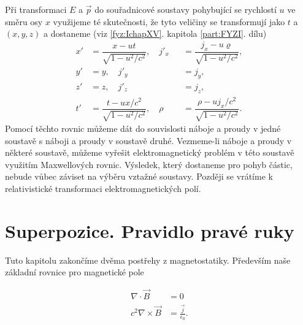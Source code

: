     Při transformaci \(E\) a \(\vec{p}\) do souřadnicové soustavy pohybující se rychlostí \(u\) ve
    směru osy \(x\) využijeme té skutečnosti, že tyto veličiny se transformují jako \(t\) a \((x, y,
    z)\) a dostaneme (viz \ref{fyz:IchapXV}. kapitola \ref{part:FYZI}. dílu)
    \begin{subequations}\label{fyz:eq824}
      \begin{alignat}{2}
        x'&=\dfrac{x -ut}{\sqrt{1−u^2/c^2}},\hspace{1em} 
        j'_x&&=\dfrac{j_x-u\varrho}{\sqrt{1−u^2/c^2}},               \label{fyz:eq824a}  \\
        y'&=y,\hspace{1em}   j'_y&&=j_y,                              \label{fyz:eq824b}  \\
        z'&=z,\hspace{1em}   j'_z&&=j_z,                              \label{fyz:eq824c}  \\
        t'&=\dfrac{t -ux/c^2}{\sqrt{1−u^2/c^2}},\hspace{1em}     
        ρ&&=\dfrac{ρ-uj_x/c^2}{\sqrt{1−u^2/c^2}}.                    \label{fyz:eq824d}    
      \end{alignat}
    \end{subequations}
    Pomocí těchto rovnic můžeme dát do souvislosti náboje a proudy v jedné soustavě s náboji a
    proudy v soustavě druhé. Vezmeme-li náboje a proudy v některé soustavě, můžeme vyřešit
    elektromagnetický problém v této soustavě využitím Maxwellových rovnic. Výsledek, který
    dostaneme pro pohyb částic, nebude vůbec záviset na výběru vztažné soustavy. Později se vrátíme
    k relativistické transformaci elektromagnetických polí.

  \section{Superpozice. Pravidlo pravé ruky}\label{fyz:IIchapXIIIsecVIII}
    Tuto kapitolu zakončíme dvěma postřehy z magnetostatiky. Především naše základní rovnice pro
    magnetické pole

      \begin{align*}
        \nabla\cdot\vec{B}     &= 0                             \\
        c^2\nabla\times\vec{B} &= \frac{\vec{j}}{\epsilon_0}.  
      \end{align*}

